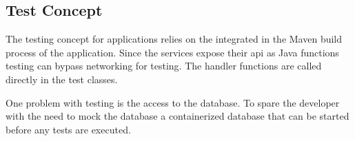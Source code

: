 \subsection{Test Concept}

The testing concept for \ms{} applications relies on the integrated in the
Maven build process of the application. Since the services expose their \gls{api} as
Java functions testing can bypass networking for testing. The handler functions
are called directly in the test classes.

One problem with \ms{} testing is the access to the database. To spare the
developer with the need to mock the database a containerized database that can
be started before any tests are executed.
